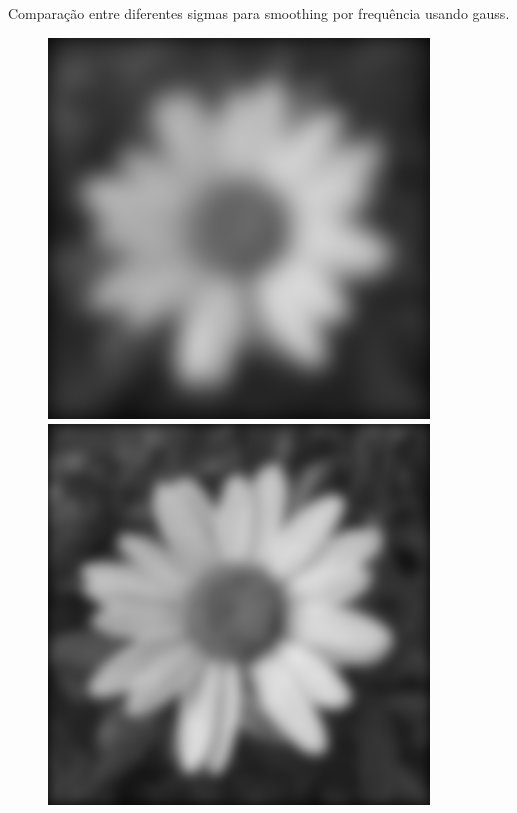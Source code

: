 \documentclass[a4paper]{report}
\begin{document}
Comparação entre diferentes sigmas para smoothing por frequência usando gauss.
\begin{figure}[H]
\centering
\begin{minipage}{.3\textwidth}
  \centering
    \includegraphics[width=0.9\textwidth]{images/Smooth/frequency-gaussian/flower_smooth_frequency_gaussian_10_1.png}
\end{minipage}%
\begin{minipage}{.3\textwidth}
  \centering
    \includegraphics[width=0.9\textwidth]{images/Smooth/frequency-gaussian/flower_smooth_frequency_gaussian_20_1.png}

\end{minipage}
\end{figure}
\end{document}
